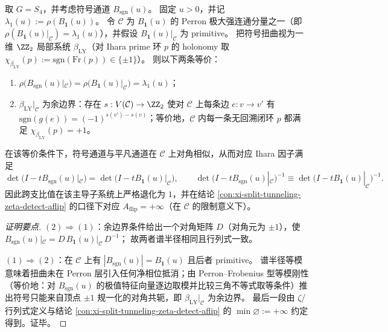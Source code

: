 \begin{corollary}\label{cor:ihara-sgn-perron-coboundary-equivalence}
取 \(G=S_4\)，并考虑符号通道 \(B_{\mathrm{sgn}}(u)\)。
固定 \(u>0\)，并记 \(\lambda_1(u):=\rho(B_{\mathbf 1}(u))\)。
令 \(\mathcal C\) 为 \(B_{\mathbf 1}(u)\) 的 Perron 极大强连通分量之一（即 \(\rho(B_{\mathbf 1}(u)|_{\mathcal C})=\lambda_1(u)\)），并假设 \(B_{\mathbf 1}(u)|_{\mathcal C}\) 为 primitive。
把符号扭曲视为一维 \(\ZZ_2\) 局部系统 \(\beta_{\mathrm{LY}}\)（对 Ihara prime 环 \(p\) 的 holonomy 取 \(\chi_{\beta_{\mathrm{LY}}}(p):=\mathrm{sgn}(\mathrm{Fr}(p))\in\{\pm1\}\)）。
则以下两条等价：
\begin{enumerate}
  \item \(\rho\!\bigl(B_{\mathrm{sgn}}(u)|_{\mathcal C}\bigr)=\rho\!\bigl(B_{\mathbf 1}(u)|_{\mathcal C}\bigr)=\lambda_1(u)\)；
  \item \(\beta_{\mathrm{LY}}|_{\mathcal C}\) 为余边界：存在 \(s:V(\mathcal C)\to\ZZ_2\) 使对 \(\mathcal C\) 上每条边 \(e:v\to v'\) 有 \(\mathrm{sgn}(g(e))=(-1)^{s(v')-s(v)}\)；等价地，\(\mathcal C\) 内每一条无回溯闭环 \(p\) 都满足 \(\chi_{\beta_{\mathrm{LY}}}(p)=+1\)。
\end{enumerate}
在该等价条件下，符号通道与平凡通道在 \(\mathcal C\) 上对角相似，从而对应 Ihara 因子满足
\[
\det\bigl(I-tB_{\mathrm{sgn}}(u)|_{\mathcal C}\bigr)=\det\bigl(I-tB_{\mathbf 1}(u)|_{\mathcal C}\bigr),
\qquad
\det\bigl(I-tB_{\mathrm{sgn}}(u)|_{\mathcal C}\bigr)^{-1}\equiv \det\bigl(I-tB_{\mathbf 1}(u)|_{\mathcal C}\bigr)^{-1}.
\]
因此跨支比值在该主导子系统上严格退化为 \(1\)，并在结论 \ref{con:xi-split-tunneling-zeta-detect-aflip} 的口径下对应 \(A_{\mathrm{flip}}=+\infty\)（在 \(\mathcal C\) 的限制意义下）。
\end{corollary}
\begin{proof}[证明要点]
\((2)\Rightarrow(1)\)：余边界条件给出一个对角矩阵 \(D\)（对角元为 \(\pm1\)），使
\(
B_{\mathrm{sgn}}(u)|_{\mathcal C}=D\,B_{\mathbf 1}(u)|_{\mathcal C}\,D^{-1}
\)；
故两者谱半径相同且行列式一致。
\par
\((1)\Rightarrow(2)\)：在 \(\mathcal C\) 上有 \(|B_{\mathrm{sgn}}(u)|=B_{\mathbf 1}(u)\) 且后者 primitive。
谱半径等模意味着扭曲未在 Perron 层引入任何净相位抵消；由 Perron--Frobenius 型等模刚性（等价地：对 \(B_{\mathrm{sgn}}(u)\) 的极值特征向量逐边取模并比较三角不等式取等条件）推出符号只能来自顶点 \(\pm1\) 规一化的对角共轭，即 \(\beta_{\mathrm{LY}}|_{\mathcal C}\) 为余边界。
最后一段由 \(\zeta\)/行列式定义与结论 \ref{con:xi-split-tunneling-zeta-detect-aflip} 的 \(\min\varnothing:=+\infty\) 约定得到。证毕。
\end{proof}

